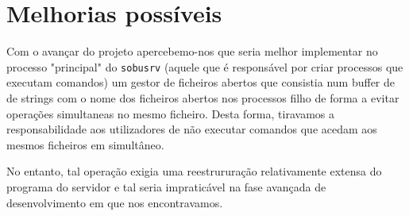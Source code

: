 \section{Melhorias possíveis}
Com o avançar do projeto apercebemo-nos que seria melhor implementar no processo "principal" do \texttt{sobusrv} 
(aquele que é responsável por criar processos que executam comandos) um gestor de ficheiros abertos que consistia num buffer de 
de strings com o nome dos ficheiros abertos nos processos filho de forma a evitar operações simultaneas no mesmo ficheiro. 
Desta forma, tiravamos a responsabilidade aos utilizadores de não executar comandos que acedam aos mesmos ficheiros em simultâneo.

No entanto, tal operação exigia uma reestrururação relativamente extensa do programa do servidor e tal seria impraticável na fase avançada
de desenvolvimento em que nos encontravamos.
